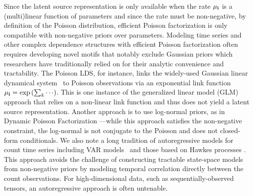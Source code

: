 \documentclass{article}
\begin{document}
Since the latent source representation is only available when the rate $\mu_{\textbf{\textrm{i}}}$ is a (multi)linear function of parameters and since the rate must be non-negative, by definition of the Poisson distribution, efficient Poisson factorization is only compatible with non-negative priors over parameters. Modeling time series and other complex dependence structures with efficient Poisson factorization often requires developing novel motifs that notably exclude Gaussian priors which researchers have traditionally relied on for their analytic convenience and tractability. The Poisson LDS, for instance, \cite{macke2011empirical} links the widely-used Gaussian linear dynamical system~\cite{kalman1961new,ghahramani1999learning} to  Poisson observations via an exponential link function $\mu_{\textbf{\textrm{i}}} = \exp\left({\sum_k \cdots}\right)$. This is one instance of the generalized linear model (GLM) \cite{nelder1972generalized} approach that relies on a non-linear link function and thus does not yield a latent source representation. Another approach is to use log-normal priors, as in Dynamic Poisson Factorization \cite{charlin2015dynamic}---while this approach satisfies the non-negative constraint, the log-normal is not conjugate to the Poisson and does not closed-form conditionals. We also note a long tradition of autoregressive models for count time series including VAR models~\cite{brandt2012bayesian} and those based on Hawkes processes \cite{blundell2012modelling,simma2012modeling,linderman2014discovering}. This approach avoids the challenge of constructing tractable state-space models from non-negative priors by modeling temporal correlation directly between the count observations. For high-dimensional data, such as sequentially-observed tensors, an autoregressive approach is often untenable. 



\end{document}
